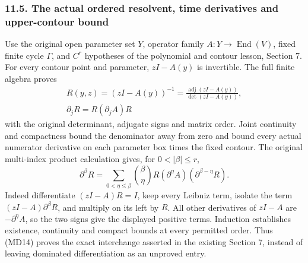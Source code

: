 \documentclass[
  11pt,
]{article}
\begin{document}
\subsubsection{11.5. The actual ordered resolvent, time derivatives and
upper-contour
bound}\label{the-actual-ordered-resolvent-time-derivatives-and-upper-contour-bound}

Use the original open parameter set \(Y\), operator family
\(A:Y\to\operatorname{End}(V)\), fixed finite cycle \(\Gamma\), and
\(C^r\) hypotheses of the polynomial and contour lesson, Section 7. For
every contour point and parameter, \(zI-A(y)\) is invertible. The full
finite algebra proves \[
\begin{gathered}
R(y,z)=(zI-A(y))^{-1}
=\frac{\operatorname{adj}(zI-A(y))}{\det(zI-A(y))},\\
\partial_jR=R(\partial_jA)R 
\end{gathered}
\tag{MD15}
\] with the original determinant, adjugate signs and matrix order. Joint
continuity and compactness bound the denominator away from zero and
bound every actual numerator derivative on each parameter box times the
fixed contour. The original multi-index product calculation gives, for
\(0<|\beta|\leq r\), \[
 \partial^\beta R
     =\sum_{0<\eta\leq\beta}
        \binom{\beta}{\eta}
              R(\partial^\eta A)(\partial^{\beta-\eta}R).
\tag{MD16}
\] Indeed differentiate \((zI-A)R=I\), keep every Leibniz term, isolate
the term \((zI-A)\partial^\beta R\), and multiply on its left by \(R\).
All other derivatives of \(zI-A\) are \(-\partial^\eta A\), so the two
signs give the displayed positive terms. Induction establishes
existence, continuity and compact bounds at every permitted order. Thus
(MD14) proves the exact interchange asserted in the existing Section 7,
instead of leaving dominated differentiation as an unproved entry.
\end{document}
